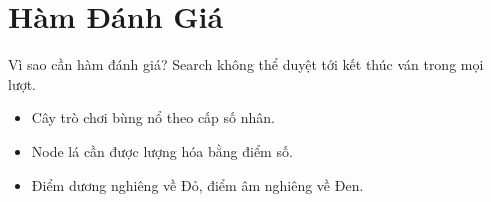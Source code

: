 \section{Hàm Đánh Giá}

\begin{frame}{Vì sao cần hàm đánh giá?}
    Search không thể duyệt tới kết thúc ván trong mọi lượt.
    \begin{itemize}[<+->]
      \item Cây trò chơi bùng nổ theo cấp số nhân.
      \item Node lá cần được lượng hóa bằng điểm số.
      \item Điểm dương nghiêng về Đỏ, điểm âm nghiêng về Đen.
    \end{itemize}
\end{frame}

